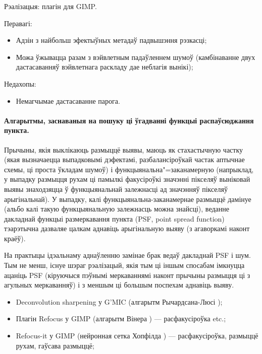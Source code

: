 \documentclass[10pt, a5paper]{article}
\begin{document}
Рэалізацыя: плагін для GIMP.

Перавагі:

\begin{itemize}
  \item Адзін з найбольш эфектыўных метадаў падвышэння рэзкасці;
  \item Можа ўжывацца разам з вэйвлетным падаўленнем шумоў (камбінаванне двух дастасаванняў вэйвлетнага раскладу дае неблагія вынікі);
\end{itemize}

Недахопы:

\begin{itemize}
  \item Немагчымае дастасаванне парога.
\end{itemize}

\paragraph*{Алгарытмы, заснаваныя на пошуку ці ўгадванні функцыі распаўсюджання пункта.}

Прычыны, якія выклікаюць размыццё выявы, маюць як стахастычную частку (якая вызначаецца выпадковымі дэфектамі, разбалансіроўкай частак аптычнае схемы, ці проста ўкладам шумоў) і функцыянальна"=заканамерную (напрыклад, у выпадку размыцця рухам ці памылкі факусіроўкі значэнні пікселяў выніковай выявы знаходзяцца ў функцыянальнай залежнасці ад значэнняў пікселяў арыгінальнай). У выпадку, калі функцыянальна-заканамернае размыццё дамінуе (альбо калі такую функцыянальную залежнасць можна знайсці), веданне дакладнай функцыі размеркавання пункта (PSF, point spread function) тэарэтычна дазваляе цалкам аднавіць арыгінальную выяву (з агаворкамі наконт краёў).

На практыцы ідэальнаму аднаўленню замінае брак ведаў дакладнай PSF і шум. Тым не менш, існуе шэраг рэалізацый, якія тым ці іншым спосабам імкнуцца ацаніць PSF (кіруючыся пэўнымі меркаваннямі наконт прычыны размыцця ці з агульных меркаванняў) і з меншым ці большым поспехам аднавіць выяву.

\begin{itemize}
  \item Deconvolution sharpening у {G'MIC} (алгарытм Рычардсана-Люсі \cite{litv2});
  \item Плагін Refocus у {GIMP} (алгарытм Вінера \cite{litv3}) — расфакусіроўка etc.;
  \item Refocus-it у {GIMP} (нейронная сетка Хопфілда \cite{litv4}) — расфакусіроўка, размыццё рухам, гаўсава размыццё;
\end{itemize}
\end{document}
